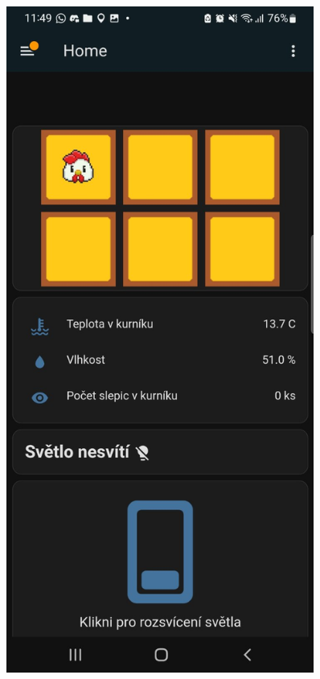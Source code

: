 \begin{figure}[H]
    \centering
    \begin{minipage}[t]{0.5\textwidth}
        \centering
        \includegraphics[width=0.9\textwidth]{img/mobilni_apka1}
        \label{fig:mobilni_apka1}
    \end{minipage}%

\end{figure}
